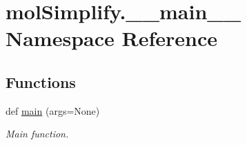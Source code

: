 \hypertarget{namespacemolSimplify_1_1____main____}{}\section{mol\+Simplify.\+\_\+\+\_\+main\+\_\+\+\_\+ Namespace Reference}
\label{namespacemolSimplify_1_1____main____}
\subsection*{Functions}
\begin{DoxyCompactItemize}
\item 
def \hyperlink{namespacemolSimplify_1_1____main_____ac0957a328f374bc27d3a68abb201da04}{main} (args=None)
\begin{DoxyCompactList}\small\item\em Main function. \end{DoxyCompactList}\end{DoxyCompactItemize}
